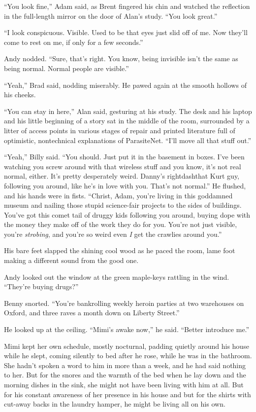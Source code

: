 ``You look fine,'' Adam said, as Brent fingered his chin and watched
the reflection in the full-length mirror on the door of Alan's study. 
``You look great.''

``I look conspicuous.  Visible.  Used to be that eyes just slid off of
me.  Now they'll come to rest on me, if only for a few seconds.''

Andy nodded.  ``Sure, that's right.  You know, being invisible isn't
the same as being normal.  Normal people are visible.''

``Yeah,'' Brad said, nodding miserably.  He pawed again at the smooth
hollows of his cheeks.

``You can stay in here,'' Alan said, gesturing at his study.  The desk
and his laptop and his little beginning of a story sat in the middle
of the room, surrounded by a litter of access points in various stages
of repair and printed literature full of optimistic, nontechnical
explanations of ParasiteNet.  ``I'll move all that stuff out.''

``Yeah,'' Billy said.  ``You should.  Just put it in the basement in
boxes.  I've been watching you screw around with that wireless stuff
and you know, it's not real normal, either.  It's pretty desperately
weird.  Danny's rightdash{}that Kurt guy, following you around, like he's
in love with you.  That's not normal.'' He flushed, and his hands were
in fists.  ``Christ, Adam, you're living in this goddamned museum and
nailing those stupid science-fair projects to the sides of buildings. 
You've got this comet tail of druggy kids following you around, buying
dope with the money they make off of the work they do for you.  You're
not just visible, you're \textit{strobing}, and you're so weird even
\textit{I} get the crawlies around you.''

His bare feet slapped the shining cool wood as he paced the room, lame
foot making a different sound from the good one.

Andy looked out the window at the green maple-keys rattling in the
wind.  ``They're buying drugs?''

Benny snorted.  ``You're bankrolling weekly heroin parties at two
warehouses on Oxford, and three raves a month down on Liberty
Street.''

He looked up at the ceiling.  ``Mimi's awake now,'' he said.  ``Better
introduce me.''

Mimi kept her own schedule, mostly nocturnal, padding quietly around
his house while he slept, coming silently to bed after he rose, while
he was in the bathroom.  She hadn't spoken a word to him in more than
a week, and he had said nothing to her.  But for the snores and the
warmth of the bed when he lay down and the morning dishes in the sink,
she might not have been living with him at all.  But for his constant
awareness of her presence in his house and but for the shirts with
cut-away backs in the laundry hamper, he might be living all on his
own.

